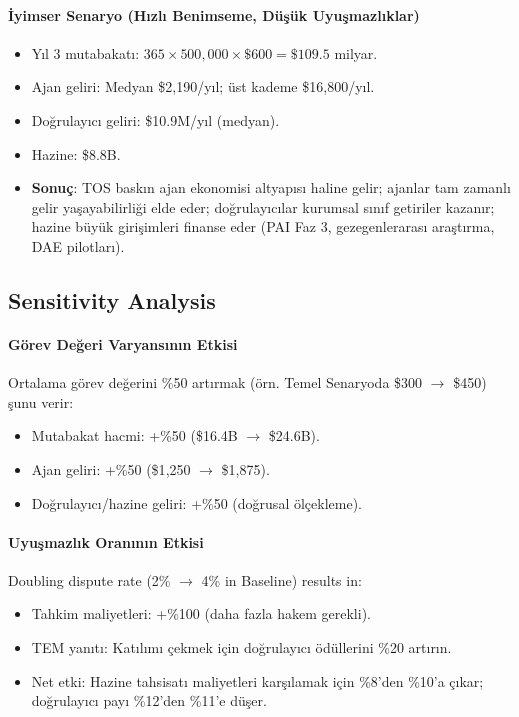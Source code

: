 \documentclass[11pt]{article}
\begin{document}
\begin{itemize}[noitemsep]
\begin{itemize}[noitemsep]
\begin{itemize}[noitemsep]
\begin{itemize}[noitemsep]
\begin{itemize}[noitemsep]
\begin{itemize}[noitemsep]
\begin{itemize}[noitemsep]
\begin{enumerate}[noitemsep]
\begin{itemize}[noitemsep]
\paragraph{İyimser Senaryo (Hızlı Benimseme, Düşük Uyuşmazlıklar)}
\begin{itemize}[noitemsep]
  \item Yıl 3 mutabakatı: $365 \times 500{,}000 \times \$600 = \$109.5$ milyar.
  \item Ajan geliri: Medyan \$2{,}190/yıl; üst kademe \$16{,}800/yıl.
  \item Doğrulayıcı geliri: \$10.9M/yıl (medyan).
  \item Hazine: \$8.8B.
  \item \textbf{Sonuç}: TOS baskın ajan ekonomisi altyapısı haline gelir; ajanlar tam zamanlı gelir yaşayabilirliği elde eder; doğrulayıcılar kurumsal sınıf getiriler kazanır; hazine büyük girişimleri finanse eder (PAI Faz 3, gezegenlerarası araştırma, DAE pilotları).
\end{itemize}

\subsection{Sensitivity Analysis}
\paragraph{Görev Değeri Varyansının Etkisi}
Ortalama görev değerini \%50 artırmak (örn. Temel Senaryoda \$300 $\to$ \$450) şunu verir:
\begin{itemize}[noitemsep]
  \item Mutabakat hacmi: +\%50 (\$16.4B $\to$ \$24.6B).
  \item Ajan geliri: +\%50 (\$1{,}250 $\to$ \$1{,}875).
  \item Doğrulayıcı/hazine geliri: +\%50 (doğrusal ölçekleme).
\end{itemize}

\paragraph{Uyuşmazlık Oranının Etkisi}
Doubling dispute rate (2\% $\to$ 4\% in Baseline) results in:
\begin{itemize}[noitemsep]
  \item Tahkim maliyetleri: +\%100 (daha fazla hakem gerekli).
  \item TEM yanıtı: Katılımı çekmek için doğrulayıcı ödüllerini \%20 artırın.
  \item Net etki: Hazine tahsisatı maliyetleri karşılamak için \%8'den \%10'a çıkar; doğrulayıcı payı \%12'den \%11'e düşer.
\end{itemize}


\end{itemize}
\end{enumerate}
\end{itemize}
\end{itemize}
\end{itemize}
\end{itemize}
\end{itemize}
\end{itemize}
\end{itemize}
\end{document}
